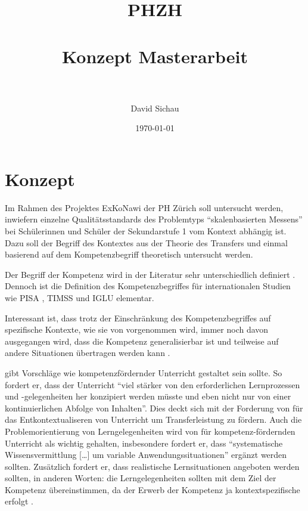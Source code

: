 \documentclass[paper=a4, fontsize=12pt, parskip=half]{scrartcl} %
\title{	
\normalfont \normalsize 
\textsc{PHZH} \\ [0.4cm] %
\horrule{0.5pt} \\[0.3cm] %
\huge Konzept Masterarbeit \\ %
\horrule{2pt} \\[0.4cm] %
}
\author{David Sichau} %
\date{\normalsize\today} %
\begin{document}
\maketitle %

\tableofcontents


\section{Konzept}

Im Rahmen des Projektes ExKoNawi der PH Zürich \citep{Gut2013a} soll untersucht werden, inwiefern einzelne Qualitätsstandards des Problemtyps "`skalenbasierten Messens"' bei Schülerinnen und Schüler der Sekundarstufe 1 vom Kontext abhängig ist. Dazu soll der Begriff des Kontextes aus der Theorie des Transfers und einmal basierend auf dem Kompetenzbegriff theoretisch untersucht werden.

Der Begriff der Kompetenz wird in der Literatur sehr unterschiedlich definiert \citep{Klieme2004, Weinert2001b}. Dennoch ist die Definition des Kompetenzbegriffes für  internationalen Studien wie PISA \citep{PISA-KonsortiumDeuschland2004}, TIMSS \citep{Martin2003} und IGLU \citep{Bos2003} elementar.

Interessant ist, dass trotz der Einschränkung des Kompetenzbegriffes auf spezifische Kontexte, wie sie von \citet{Klieme2004} vorgenommen wird, immer noch davon ausgegangen wird, dass die Kompetenz generalisierbar ist und teilweise auf andere Situationen übertragen werden kann \citep{Hartig2006}.

\citet{Lersch2007} gibt Vorschläge wie kompetenzfördernder Unterricht gestaltet sein sollte. So fordert er, dass der Unterricht "`viel stärker von den erforderlichen Lernprozessen und -gelegenheiten her konzipiert werden müsste und eben nicht nur von einer kontinuierlichen Abfolge von Inhalten"'. Dies deckt sich mit der Forderung von \citet{Mietzel2007} für das Entkontextualiseren von Unterricht um Transferleistung zu fördern. Auch die Problemorientierung von Lerngelegenheiten wird von \citet{Lersch2007} für kompetenz-fördernden Unterricht als wichtig gehalten, insbesondere fordert er, dass "`systematische Wissensvermittlung […] um variable Anwendungssituationen"' ergänzt werden sollten. Zusätzlich fordert er, dass realistische Lernsituationen angeboten werden sollten, in anderen Worten: die Lerngelegenheiten sollten mit dem Ziel der Kompetenz übereinstimmen, da der Erwerb der Kompetenz ja kontextspezifische erfolgt \citep{Klieme2004}.
\end{document}
